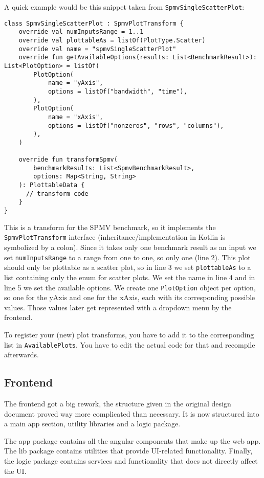 A quick example would be this snippet taken from \texttt{SpmvSingleScatterPlot}:

\begin{lstlisting}[style=JAVA]
class SpmvSingleScatterPlot : SpmvPlotTransform {
    override val numInputsRange = 1..1
    override val plottableAs = listOf(PlotType.Scatter)
    override val name = "spmvSingleScatterPlot"
    override fun getAvailableOptions(results: List<BenchmarkResult>): List<PlotOption> = listOf(
        PlotOption(
            name = "yAxis",
            options = listOf("bandwidth", "time"),
        ),
        PlotOption(
            name = "xAxis",
            options = listOf("nonzeros", "rows", "columns"),
        ),
    )

    override fun transformSpmv(
        benchmarkResults: List<SpmvBenchmarkResult>,
        options: Map<String, String>
    ): PlottableData {
      // transform code
    }
}
\end{lstlisting}

This is a transform for the SPMV benchmark, so it implements the \texttt{SpmvPlotTransform} interface (inheritance/implementation in Kotlin is symbolized by a colon). Since it takes only one benchmark result as an input we set \texttt{numInputsRange} to a range from one to one, so only one (line 2). This plot should only be plottable as a scatter plot, so in line 3 we set \texttt{plottableAs} to a list containing only the enum for scatter plots. We set the name in line 4 and in line 5 we set the available options. We create one \texttt{PlotOption} object per option, so one for the yAxis and one for the xAxis, each with its corresponding possible values. Those values later get represented with a dropdown menu by the frontend.

To register your (new) plot transforms, you have to add it to the corresponding list in \texttt{AvailablePlots}. You have to edit the actual code for that and recompile afterwards.

\subsection{Frontend}

The frontend got a big rework, the structure given in the original design document proved way more complicated than necessary. It is now structured into a main app section, utility libraries and a logic package.

The app package contains all the angular components that make up the web app. The lib package contains utilities that provide UI-related functionality. Finally, the logic package contains services and functionality that does not directly affect the UI.

